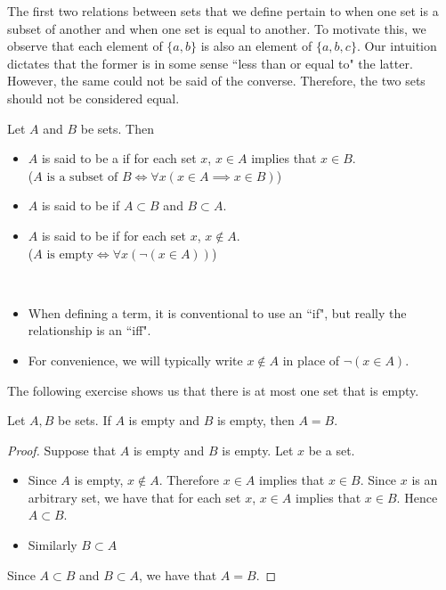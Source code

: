 \documentclass{book}
\begin{document}
	The first two relations between sets that we define pertain to when one set is a subset of another and when one set is equal to another. To motivate this, we observe that each element of $\{a,b\}$ is also an element of $\{a, b, c\}$. Our intuition dictates that the former is in some sense ``less than or equal to" the latter. However, the same could not be said of the converse. Therefore, the two sets should not be considered equal.
	\begin{defn}
		Let $A$ and $B$ be sets. Then 
		\begin{itemize}
			\item $A$ is said to be a  if for each set $x$, $x \in A$ implies that $x \in B$. \\
			($\text{$A$ is a subset of $B$} \iff \forall x (x \in A \implies x \in B)$)
			\item $A$ is said to be  if $A \subset B$ and $B \subset A$. 
			\item $A$ is said to be  if for each set $x$, $x \not \in A$. \\
			($\text{$A$ is empty} \iff \forall x ( \neg(x \in A))$)
		\end{itemize}
	\end{defn}
	
	\begin{note}\
		\begin{itemize}
			\item When defining a term, it is conventional to use an ``if", but really the relationship is an ``iff".
			\item For convenience, we will typically write $x \not \in A$ in place of $\neg(x \in A)$.
		\end{itemize}
	\end{note}
	
	The following exercise shows us that there is at most one set that is empty.
	\begin{ex}
		Let $A, B$ be sets. If $A$ is empty and $B$ is empty, then $A= B$. 
	\end{ex}
	
	\begin{proof}
		Suppose that $A$ is empty and $B$ is empty. Let $x$ be a set. 
		\begin{itemize}
			\item Since $A$ is empty, $x \not \in A$. Therefore $x \in A$ implies that $x \in B$. Since $x$ is an arbitrary set, we have that for each set $x$, $x \in A$ implies that $x \in B$. Hence $A \subset B$.
			\item Similarly $B \subset A$
		\end{itemize}
		Since $A \subset B$ and $B \subset A$, we have that $A = B$.
	\end{proof}
	
\end{document}

